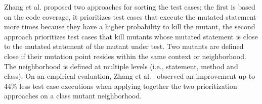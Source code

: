 
Zhang et al. \cite{zhang2013faster} proposed two approaches for sorting the test cases; the first is based on the code coverage, it prioritizes test cases that execute the mutated statement more times because they have a higher probability to kill the mutant, 
the second approach prioritizes test cases that kill mutants whose mutated statement is close to the mutated statement of the mutant under test. Two mutants are defined close if their mutation point resides within the same context or neighborhood. The neighborhood is defined at multiple levels (i.e., statement, method and class).
On an empirical evaluation, Zhang et al.~\cite{zhang2013operator} observed an improvement up to 44\% less test case executions when applying together the two prioritization approaches on a class mutant neighborhood. 



